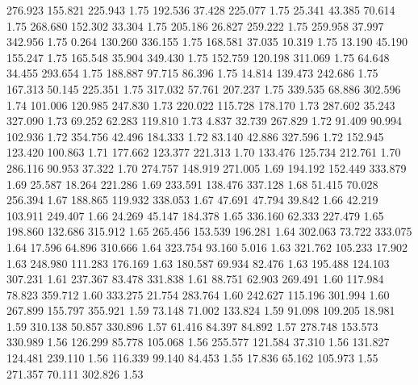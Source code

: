  276.923  155.821  225.943         1.75
 192.536   37.428  225.077         1.75
  25.341   43.385   70.614         1.75
 268.680  152.302   33.304         1.75
 205.186   26.827  259.222         1.75
 259.958   37.997  342.956         1.75
   0.264  130.260  336.155         1.75
 168.581   37.035   10.319         1.75
  13.190   45.190  155.247         1.75
 165.548   35.904  349.430         1.75
 152.759  120.198  311.069         1.75
  64.648   34.455  293.654         1.75
 188.887   97.715   86.396         1.75
  14.814  139.473  242.686         1.75
 167.313   50.145  225.351         1.75
 317.032   57.761  207.237         1.75
 339.535   68.886  302.596         1.74
 101.006  120.985  247.830         1.73
 220.022  115.728  178.170         1.73
 287.602   35.243  327.090         1.73
  69.252   62.283  119.810         1.73
   4.837   32.739  267.829         1.72
  91.409   90.994  102.936         1.72
 354.756   42.496  184.333         1.72
  83.140   42.886  327.596         1.72
 152.945  123.420  100.863         1.71
 177.662  123.377  221.313         1.70
 133.476  125.734  212.761         1.70
 286.116   90.953   37.322         1.70
 274.757  148.919  271.005         1.69
 194.192  152.449  333.879         1.69
  25.587   18.264  221.286         1.69
 233.591  138.476  337.128         1.68
  51.415   70.028  256.394         1.67
 188.865  119.932  338.053         1.67
  47.691   47.794   39.842         1.66
  42.219  103.911  249.407         1.66
  24.269   45.147  184.378         1.65
 336.160   62.333  227.479         1.65
 198.860  132.686  315.912         1.65
 265.456  153.539  196.281         1.64
 302.063   73.722  333.075         1.64
  17.596   64.896  310.666         1.64
 323.754   93.160    5.016         1.63
 321.762  105.233   17.902         1.63
 248.980  111.283  176.169         1.63
 180.587   69.934   82.476         1.63
 195.488  124.103  307.231         1.61
 237.367   83.478  331.838         1.61
  88.751   62.903  269.491         1.60
 117.984   78.823  359.712         1.60
 333.275   21.754  283.764         1.60
 242.627  115.196  301.994         1.60
 267.899  155.797  355.921         1.59
  73.148   71.002  133.824         1.59
  91.098  109.205   18.981         1.59
 310.138   50.857  330.896         1.57
  61.416   84.397   84.892         1.57
 278.748  153.573  330.989         1.56
 126.299   85.778  105.068         1.56
 255.577  121.584   37.310         1.56
 131.827  124.481  239.110         1.56
 116.339   99.140   84.453         1.55
  17.836   65.162  105.973         1.55
 271.357   70.111  302.826         1.53
